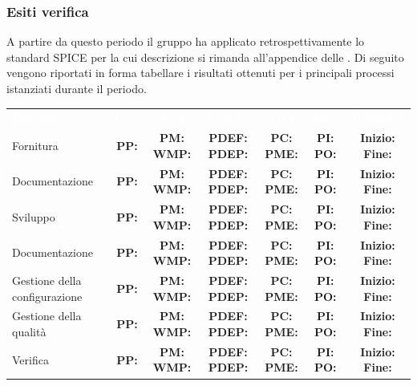 \subsubsection{Esiti verifica}
A partire da questo periodo il gruppo ha applicato retrospettivamente lo standard SPICE per la cui descrizione si rimanda all'appendice delle . Di seguito vengono riportati in forma tabellare i risultati ottenuti per i principali processi istanziati durante il periodo. 
\begin{table} [H]
	\begin{center}
		\begin{tabular}{|C{3cm}|c|c|c|c|c|c|}
			\textcolor{white}{\textbf{Processo}}&
			\textcolor{white}{\textbf{Liv1}}&
			\textcolor{white}{\textbf{Liv2}}&
			\textcolor{white}{\textbf{Liv3}}&
			\textcolor{white}{\textbf{Liv4}}&
			\textcolor{white}{\textbf{Liv5}}&
			\textcolor{white}{\textbf{Risultato}}\\
				
			Fornitura & \textbf{PP:} & \textbf{PM:} \textbf{WMP:} & \textbf{PDEF:} \textbf{PDEP:} & \textbf{PC:} \textbf{PME:} &
			\textbf{PI:} \textbf{PO:} & \textbf{Inizio:} \textbf{Fine:} \\ \hline
			
			Documentazione & \textbf{PP:} & \textbf{PM:} \textbf{WMP:} & \textbf{PDEF:} \textbf{PDEP:} & \textbf{PC:} \textbf{PME:} &
			\textbf{PI:} \textbf{PO:} & \textbf{Inizio:} \textbf{Fine:} \\ \hline
			
			Sviluppo & \textbf{PP:} & \textbf{PM:} \textbf{WMP:} & \textbf{PDEF:} \textbf{PDEP:} & \textbf{PC:} \textbf{PME:} &
			\textbf{PI:} \textbf{PO:} & \textbf{Inizio:} \textbf{Fine:} \\ \hline
			
			Documentazione & \textbf{PP:} & \textbf{PM:} \textbf{WMP:} & \textbf{PDEF:} \textbf{PDEP:} & \textbf{PC:} \textbf{PME:} &
			\textbf{PI:} \textbf{PO:} & \textbf{Inizio:} \textbf{Fine:} \\ \hline
			
			Gestione della configurazione & \textbf{PP:} & \textbf{PM:} \textbf{WMP:} & \textbf{PDEF:} \textbf{PDEP:} & \textbf{PC:} \textbf{PME:} &
			\textbf{PI:} \textbf{PO:} & \textbf{Inizio:} \textbf{Fine:} \\ \hline
			
			Gestione della qualità & \textbf{PP:} & \textbf{PM:} \textbf{WMP:} & \textbf{PDEF:} \textbf{PDEP:} & \textbf{PC:} \textbf{PME:} &
			\textbf{PI:} \textbf{PO:} & \textbf{Inizio:} \textbf{Fine:} \\ \hline
			
			Verifica & \textbf{PP:} & \textbf{PM:} \textbf{WMP:} & \textbf{PDEF:} \textbf{PDEP:} & \textbf{PC:} \textbf{PME:} &
			\textbf{PI:} \textbf{PO:} & \textbf{Inizio:} \textbf{Fine:} \\ \hline	
		\end{tabular}
	\end{center}
\end{table}
